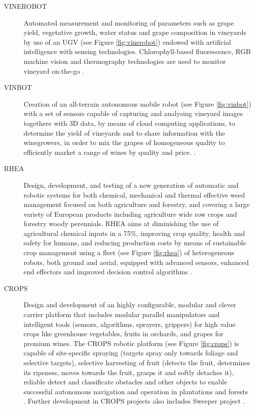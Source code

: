 \begin{description}
	\item[VINEROBOT] Automated measurement and monitoring of parameters such as grape yield, vegetative growth, water status and grape composition in vineyards by use of an \ac{UGV} (see Figure \ref{fig:vinerobot}) endowed with artificial intelligence with sensing technologies. Chlorophyll-based fluorescence, RGB machine vision and thermography technologies are used to monitor vineyard on-the-go \parencite{vinerobot}.
	\item[VINBOT] Creation of an all-terrain autonomous mobile robot (see Figure \ref{fig:vinbot}) with a set of sensors capable of capturing and analysing vineyard images togethere with 3D data, by means of cloud computing applications, to determine the yield of vineyards and to share information with the winegrowers, in order to mix the grapes of homogeneous quality to efficiently market a range of wines by quality and price. \parencite{vinbot}.
	\item[RHEA] Design, development, and testing of a new generation of automatic and robotic systems for both chemical, mechanical and thermal effective weed management focused on both agriculture and forestry, and covering a large variety of European products including agriculture wide row crops and forestry woody perennials. RHEA aims at diminishing the use of agricultural chemical inputs in a 75\%, improving crop quality, health and safety for humans, and reducing production costs by means of sustainable crop management using a fleet (see Figure \ref{fig:rhea}) of heterogeneous robots, both ground and aerial, equipped with advanced sensors, enhanced end effectors and improved decision control algorithms \parencite{rhea}.
	\item[CROPS] Design and development of an highly configurable, modular and clever carrier platform that includes modular parallel manipulators and intelligent tools (sensors, algorithms, sprayers, grippers) for high value crops like greenhouse vegetables, fruits in orchards, and grapes for premium wines. The CROPS robotic platform (see Figure \ref{fig:crops}) is capable of site-specific spraying (targets spray only towards foliage and selective targets), selective harvesting of fruit (detects the fruit, determines its ripeness, moves towards the fruit, grasps it and softly detaches it), reliable detect and classificate obstacles and other objects to enable successful autonomous navigation and operation in plantations and forests \parencite{crops}. Further development in CROPS projects also includes Sweeper project \parencite{sweeper}.
\end{description}


